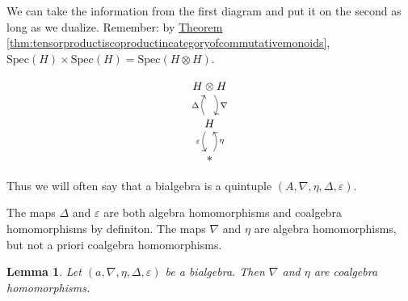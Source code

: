 \documentclass[a4paper,10pt]{scrreprt}
\newcommand{\spec}{\mathrm{Spec}}
\theoremstyle{definition}
\theoremstyle{plain}
\newtheorem{lemma}{Lemma}[section]
\theoremstyle{remark}
\begin{document}
We can take the information from the first diagram and put it on the second as long as we dualize. Remember: by \hyperref[thm:tensorproductiscoproductincategoryofcommutativemonoids]{Theorem \ref*{thm:tensorproductiscoproductincategoryofcommutativemonoids}}, $\spec(H) \times \spec(H) = \spec(H \otimes H)$.

\begin{equation*}
  \begin{tikzcd}
    H \otimes H
    \arrow[d, bend left, "\nabla"]
    \\
    H
    \arrow[u, bend left, "\Delta"]
    \arrow[d, swap, bend right, "\varepsilon"]
    \\
    *
    \arrow[u, swap, bend right, "\eta"]
  \end{tikzcd}
\end{equation*}

Thus we will often say that a bialgebra is a quintuple $(A, \nabla, \eta, \Delta, \varepsilon)$.

The maps $\Delta$ and $\varepsilon$ are both algebra homomorphisms and coalgebra homomorphisms by definiton. The maps $\nabla$ and $\eta$ are algebra homomorphisms, but not a priori coalgebra homomorphisms. 

\begin{lemma}
  Let $(a, \nabla, \eta, \Delta, \varepsilon)$ be a bialgebra. Then $\nabla$ and $\eta$ are coalgebra homomorphisms.
\end{lemma}
\end{document}
